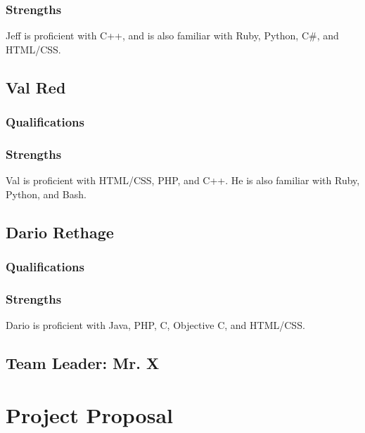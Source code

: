 \documentclass[11pt,letterpaper,oneside]{memoir}
\begin{document}
\subsection{Strengths}
Jeff is proficient with C++, and is also familiar with Ruby, Python,
C\#, and HTML/CSS.

\section{Val Red}

\subsection{Qualifications}
\subsection{Strengths}
Val is proficient with HTML/CSS, PHP, and C++. He is also familiar with
Ruby, Python, and Bash.

\section{Dario Rethage}

\subsection{Qualifications}
\subsection{Strengths}
Dario is proficient with Java, PHP, C, Objective C, and HTML/CSS. 

\section{Team Leader: Mr. X}

\chapter{Project Proposal}
\label{proposal}
\end{document}
